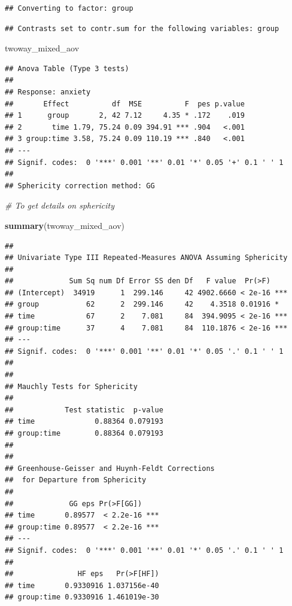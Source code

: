 \documentclass[
]{book}
\newenvironment{Shaded}{\begin{snugshade}}{\end{snugshade}}
\newcommand{\CommentTok}[1]{\textcolor[rgb]{0.56,0.35,0.01}{\textit{#1}}}
\newcommand{\FunctionTok}[1]{\textcolor[rgb]{0.13,0.29,0.53}{\textbf{#1}}}
\newcommand{\NormalTok}[1]{#1}
\begin{document}
\begin{verbatim}
## Converting to factor: group
\end{verbatim}

\begin{verbatim}
## Contrasts set to contr.sum for the following variables: group
\end{verbatim}

\begin{Shaded}
\begin{Highlighting}[]
\NormalTok{twoway\_mixed\_aov}
\end{Highlighting}
\end{Shaded}

\begin{verbatim}
## Anova Table (Type 3 tests)
## 
## Response: anxiety
##       Effect          df  MSE          F  pes p.value
## 1      group       2, 42 7.12     4.35 * .172    .019
## 2       time 1.79, 75.24 0.09 394.91 *** .904   <.001
## 3 group:time 3.58, 75.24 0.09 110.19 *** .840   <.001
## ---
## Signif. codes:  0 '***' 0.001 '**' 0.01 '*' 0.05 '+' 0.1 ' ' 1
## 
## Sphericity correction method: GG
\end{verbatim}

\begin{Shaded}
\begin{Highlighting}[]
\CommentTok{\# To get details on sphericity}

\FunctionTok{summary}\NormalTok{(twoway\_mixed\_aov)}
\end{Highlighting}
\end{Shaded}

\begin{verbatim}
## 
## Univariate Type III Repeated-Measures ANOVA Assuming Sphericity
## 
##             Sum Sq num Df Error SS den Df   F value  Pr(>F)    
## (Intercept)  34919      1  299.146     42 4902.6660 < 2e-16 ***
## group           62      2  299.146     42    4.3518 0.01916 *  
## time            67      2    7.081     84  394.9095 < 2e-16 ***
## group:time      37      4    7.081     84  110.1876 < 2e-16 ***
## ---
## Signif. codes:  0 '***' 0.001 '**' 0.01 '*' 0.05 '.' 0.1 ' ' 1
## 
## 
## Mauchly Tests for Sphericity
## 
##            Test statistic  p-value
## time              0.88364 0.079193
## group:time        0.88364 0.079193
## 
## 
## Greenhouse-Geisser and Huynh-Feldt Corrections
##  for Departure from Sphericity
## 
##             GG eps Pr(>F[GG])    
## time       0.89577  < 2.2e-16 ***
## group:time 0.89577  < 2.2e-16 ***
## ---
## Signif. codes:  0 '***' 0.001 '**' 0.01 '*' 0.05 '.' 0.1 ' ' 1
## 
##               HF eps   Pr(>F[HF])
## time       0.9330916 1.037156e-40
## group:time 0.9330916 1.461019e-30
\end{verbatim}
\end{document}
